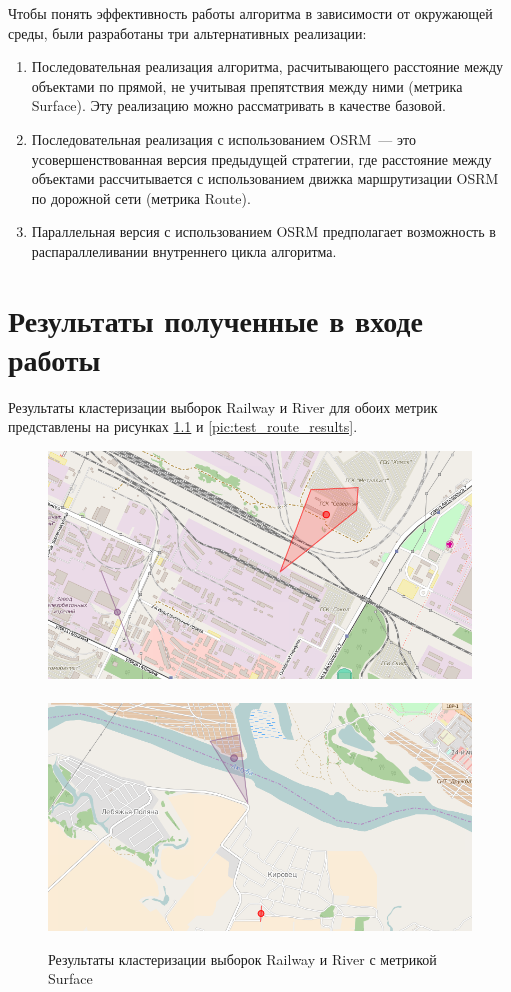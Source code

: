 \documentclass[a4paper, 14pt]{extreport}
\begin{document}
    Чтобы понять эффективность работы алгоритма в зависимости от окружающей среды, были разработаны три альтернативных 
    реализации:
    \begin{enumerate}
        \item Последовательная реализация алгоритма, расчитывающего расстояние между объектами по прямой, не учитывая препятствия между ними (метрика Surface). Эту реализацию можно рассматривать в качестве базовой.
        \item Последовательная реализация с использованием OSRM~--- это усовершенствованная версия 
            предыдущей стратегии, где расстояние между объектами рассчитывается с использованием движка 
            маршрутизации OSRM по дорожной сети (метрика Route).
        \item Параллельная версия с использованием OSRM предполагает возможность в распараллеливании внутреннего цикла алгоритма.  
    \end{enumerate}

    \chapter{Результаты полученные в входе работы}
    Результаты кластеризации выборок Railway и River для обоих метрик представлены на рисунках \ref{pic:test_surface_results} и \ref{pic:test_route_results}.

\begin{figure}[h!]
    \includegraphics[width=.47\textwidth]{railway_surface}\
    \includegraphics[width=.47\textwidth]{river_surface} \\[1ex]
    \parbox{.95\textwidth}{\caption{Результаты кластеризации выборок Railway и River с метрикой Surface}\label{pic:test_surface_results}}
    \vspace*{-3ex}
\end{figure}
\end{document}
